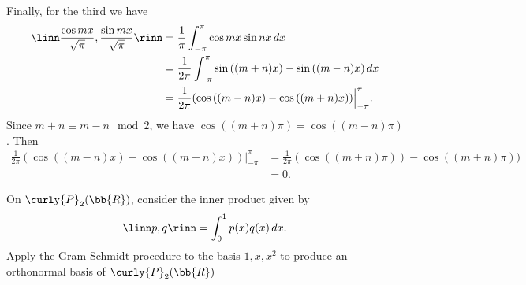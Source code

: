 \documentclass[12pt, letterpaper]{hmcpset}
\begin{document}
\begin{solution}
	Finally, for the third we have
	\[
		\begin{split}
			\linn \frac{\cos{mx}}{\sqrt \pi}, \frac{\sin{mx}}{\sqrt \pi} \rinn & = \frac{1}{\pi} \int_{-\pi}^\pi \cos{mx} \sin{nx} \, dx \\
											   & = \frac{1}{2 \pi} \int_{-\pi}^\pi \sin{((m + n)x)} - \sin{((m - n)x)} \, dx \\
											   & = \frac{1}{2 \pi} ( \cos{((m - n)x)} - \cos{((m + n)x)} ) \Big |_{-\pi}^\pi.
		\end{split}
	\]
	Since $m + n \equiv m - n \mod 2$, we have $\cos{((m + n)\pi)} = \cos{((m - n)\pi)}$. Then
	\[
		\begin{split}
			\frac{1}{2 \pi} ( \cos{((m - n)x)} - \cos{((m + n)x)} ) \Big |_{-\pi}^\pi & = \frac{1}{2 \pi}(\cos{((m + n) \pi)}) - \cos{((m + n) \pi)}) \\
												  & = 0.
		\end{split}
	\]
\end{solution}

\pagebreak

\begin{problem}[5]
	On $\curly{P}_2(\bb{R})$, consider the inner product given by
	\[
		\linn p, q \rinn = \int_0^1 p(x) q(x) \, dx.
	\]
	Apply the Gram-Schmidt procedure to the basis $1, x, x^2$ to produce an orthonormal basis of $\curly{P}_2(\bb{R})$
\end{problem}
\end{document}
